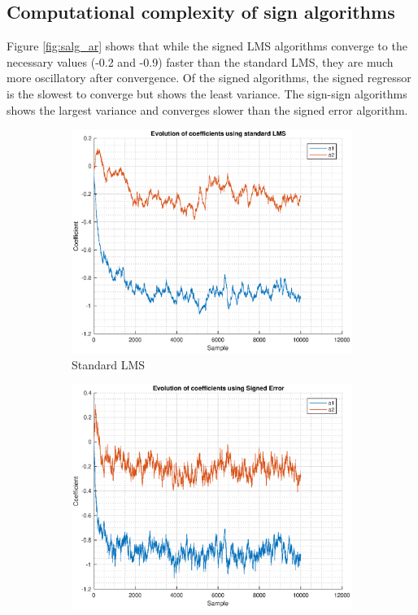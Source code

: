 \documentclass{article}
\begin{document}
\pagebreak

\subsection{Computational complexity of sign algorithms}

Figure \ref{fig:salg_ar} shows that while the signed LMS algorithms converge to the necessary values (-0.2 and -0.9) faster than the standard LMS, they are much more oscillatory after convergence. Of the signed algorithms, the signed regressor is the slowest to converge but shows the least variance. The sign-sign algorithms shows the largest variance and converges slower than the signed error algorithm.

\begin{figure}[h!]
\centering
\begin{subfigure}{0.33\textwidth}
\centering
\includegraphics[width = \textwidth]{salg_lms_ar}
\caption{Standard LMS}
\label{fig:salg_lms_ar}
\end{subfigure}
\begin{subfigure}{0.33\textwidth}
\centering
\includegraphics[width = \textwidth]{salg_signerr_ar}

\end{subfigure}
\end{figure}
\end{document}
